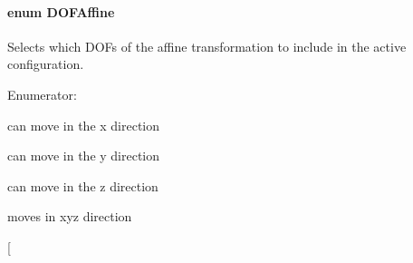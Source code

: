\hypertarget{namespaceOpenRAVE_a3016e2185103f3c1bdc5e4482893ca98}{
\paragraph[{DOFAffine}]{\setlength{\rightskip}{0pt plus 5cm}enum {\bf DOFAffine}}\hfill}
\label{namespaceOpenRAVE_a3016e2185103f3c1bdc5e4482893ca98}


Selects which DOFs of the affine transformation to include in the active configuration. 

\begin{Desc}
\item[Enumerator: ]\par
\begin{description}
\item[{\em 
\hypertarget{namespaceOpenRAVE_a3016e2185103f3c1bdc5e4482893ca98a631e4be716fa05920e2708264c946507}{
DOF\_\-X}
\label{namespaceOpenRAVE_a3016e2185103f3c1bdc5e4482893ca98a631e4be716fa05920e2708264c946507}
}]can move in the x direction \item[{\em 
\hypertarget{namespaceOpenRAVE_a3016e2185103f3c1bdc5e4482893ca98a052eaa27c587eff647f89537d85414f2}{
DOF\_\-Y}
\label{namespaceOpenRAVE_a3016e2185103f3c1bdc5e4482893ca98a052eaa27c587eff647f89537d85414f2}
}]can move in the y direction \item[{\em 
\hypertarget{namespaceOpenRAVE_a3016e2185103f3c1bdc5e4482893ca98ab8457ea80d330d3a701781b6bc9a935b}{
DOF\_\-Z}
\label{namespaceOpenRAVE_a3016e2185103f3c1bdc5e4482893ca98ab8457ea80d330d3a701781b6bc9a935b}
}]can move in the z direction \item[{\em 
\hypertarget{namespaceOpenRAVE_a3016e2185103f3c1bdc5e4482893ca98abf4ca11208a260b3c892db6f3aa87126}{
DOF\_\-XYZ}
\label{namespaceOpenRAVE_a3016e2185103f3c1bdc5e4482893ca98abf4ca11208a260b3c892db6f3aa87126}
}]moves in xyz direction \item[{\em 
\hypertarget{namespaceOpenRAVE_a3016e2185103f3c1bdc5e4482893ca98a5ee6baa8acb92c310cbc1ece082640d0}{
}}
\end{description}
\end{Desc}
